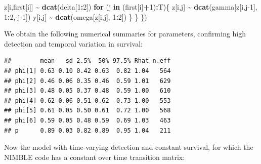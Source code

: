 \documentclass[
  12pt,
]{krantz}
\newenvironment{Shaded}{\begin{snugshade}}{\end{snugshade}}
\newcommand{\ControlFlowTok}[1]{\textcolor[rgb]{0.13,0.29,0.53}{\textbf{#1}}}
\newcommand{\DecValTok}[1]{\textcolor[rgb]{0.00,0.00,0.81}{#1}}
\newcommand{\FunctionTok}[1]{\textcolor[rgb]{0.13,0.29,0.53}{\textbf{#1}}}
\newcommand{\NormalTok}[1]{#1}
\newcommand{\SpecialCharTok}[1]{\textcolor[rgb]{0.81,0.36,0.00}{\textbf{#1}}}
\begin{document}
\begin{Shaded}
\begin{Highlighting}[]
\NormalTok{    z[i,first[i]] }\SpecialCharTok{\textasciitilde{}} \FunctionTok{dcat}\NormalTok{(delta[}\DecValTok{1}\SpecialCharTok{:}\DecValTok{2}\NormalTok{])}
    \ControlFlowTok{for}\NormalTok{ (j }\ControlFlowTok{in}\NormalTok{ (first[i]}\SpecialCharTok{+}\DecValTok{1}\NormalTok{)}\SpecialCharTok{:}\NormalTok{T)\{}
\NormalTok{      z[i,j] }\SpecialCharTok{\textasciitilde{}} \FunctionTok{dcat}\NormalTok{(gamma[z[i,j}\DecValTok{{-}1}\NormalTok{], }\DecValTok{1}\SpecialCharTok{:}\DecValTok{2}\NormalTok{, j}\DecValTok{{-}1}\NormalTok{])}
\NormalTok{      y[i,j] }\SpecialCharTok{\textasciitilde{}} \FunctionTok{dcat}\NormalTok{(omega[z[i,j], }\DecValTok{1}\SpecialCharTok{:}\DecValTok{2}\NormalTok{])}
\NormalTok{    \}}
\NormalTok{  \}}
\NormalTok{\})}
\end{Highlighting}
\end{Shaded}

We obtain the following numerical summaries for parameters, confirming high detection and temporal variation in survival:

\begin{verbatim}
##        mean   sd 2.5%  50% 97.5% Rhat n.eff
## phi[1] 0.63 0.10 0.42 0.63  0.82 1.04   564
## phi[2] 0.46 0.06 0.35 0.46  0.59 1.01   629
## phi[3] 0.48 0.05 0.37 0.48  0.59 1.00   610
## phi[4] 0.62 0.06 0.51 0.62  0.73 1.00   553
## phi[5] 0.61 0.05 0.50 0.61  0.72 1.00   568
## phi[6] 0.59 0.05 0.48 0.59  0.69 1.03   463
## p      0.89 0.03 0.82 0.89  0.95 1.04   211
\end{verbatim}

Now the model with time-varying detection and constant survival, for which the NIMBLE code has a constant over time transition matrix:
\end{document}

